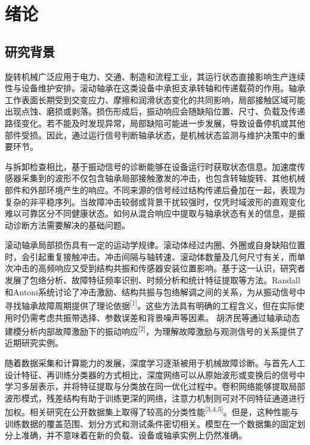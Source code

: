 \documentclass[UTF8,12pt,openany,twoside]{ctexbook}
\numberwithin{equation}{chapter}
\begin{document}
\tableofcontents
\mainmatter
\chapter{绪论}\label{ux7b2c1ux7ae0-ux7eeaux8bba}

\section{研究背景}\label{ux7814ux7a76ux80ccux666f}

旋转机械广泛应用于电力、交通、制造和流程工业，其运行状态直接影响生产连续性与设备维护安排。滚动轴承在这类设备中承担支承转轴和传递载荷的作用。轴承工作表面长期受到交变应力、摩擦和润滑状态变化的共同影响，局部接触区域可能出现点蚀、磨损或剥落。损伤形成后，振动响应会随缺陷位置、尺寸、负载及传递路径变化。若不能及时发现异常，局部缺陷可能进一步发展，导致设备停机或其他部件受损。因此，通过运行信号判断轴承状态，是机械状态监测与维护决策中的重要环节。

与拆卸检查相比，基于振动信号的诊断能够在设备运行时获取状态信息。加速度传感器采集到的波形不仅包含轴承局部接触激发的冲击，也包含转轴旋转、其他机械部件和外部环境产生的响应。不同来源的信号经过结构传递后叠加在一起，表现为复杂的非平稳序列。当故障冲击较弱或背景干扰较强时，仅凭时域波形的直观变化难以可靠区分不同健康状态。如何从混合响应中提取与轴承状态有关的信息，是振动诊断方法需要解决的基础问题。

滚动轴承局部损伤具有一定的运动学规律。滚动体经过内圈、外圈或自身缺陷位置时，会引起重复接触冲击。冲击间隔与轴转速、滚动体数量及几何尺寸有关，而单次冲击的高频响应又受到结构共振和传感器安装位置影响。基于这一认识，研究者发展了包络分析、故障特征频率识别、时频分析和统计特征提取等方法。Randall和Antoni系统讨论了冲击激励、结构共振与包络解调之间的关系，为从振动信号中寻找轴承故障周期提供了理论依据\textsuperscript{[1]}。这些方法具有明确的工程含义，但在实际使用时仍需考虑共振带选择、参数误差和背景噪声等因素。 胡济民等通过轴承动态建模分析内部故障激励下的振动响应\textsuperscript{[2]}，为理解故障激励与观测信号的关系提供了近期研究实例。

随着数据采集和计算能力的发展，深度学习逐渐被用于机械故障诊断。与首先人工设计特征、再训练分类器的方式相比，深度网络可以从原始波形或变换后的信号中学习多层表示，并将特征提取与分类放在同一优化过程中。卷积网络能够提取局部波形模式，残差结构有助于训练更深的网络，注意力机制则可对不同特征通道进行加权。相关研究在公开数据集上取得了较高的分类性能\textsuperscript{[3,4,5]}。但是，这种性能与训练数据的覆盖范围、划分方式和测试条件密切相关。模型在一个数据集的固定划分上准确，并不意味着在新的负载、设备或轴承实例上仍然准确。
\end{document}
